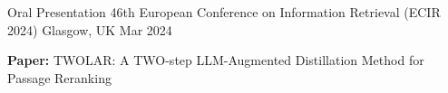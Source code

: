

\begin{cventries}

  \cventry
    {Oral Presentation} %
    {46th European Conference on Information Retrieval (ECIR 2024)} %
    {Glasgow, UK} %
    {Mar 2024} %
    {
      \begin{cvitems} %
        \item {\textbf{Paper:} TWOLAR: A TWO-step LLM-Augmented Distillation Method for Passage Reranking}
      \end{cvitems}
    }


\end{cventries}

